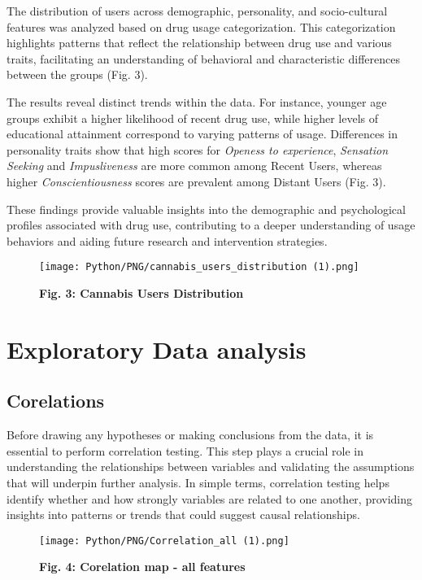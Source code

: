 \documentclass{article}
\begin{document}
\hspace{1cm}The distribution of users across demographic, personality, and socio-cultural features was analyzed based on drug usage categorization. This categorization highlights patterns that reflect the relationship between drug use and various traits, facilitating an understanding of behavioral and characteristic differences between the groups (Fig. 3).

The results reveal distinct trends within the data. For instance, younger age groups exhibit a higher likelihood of recent drug use, while higher levels of educational attainment correspond to varying patterns of usage. Differences in personality traits show that high scores for \textit{Openess to experience}, \textit{Sensation Seeking} and \textit{Impusliveness} are more common among Recent Users, whereas higher \textit{Conscientiousness} scores are prevalent among Distant Users (Fig. 3).

These findings provide valuable insights into the demographic and psychological profiles associated with drug use, contributing to a deeper understanding of usage behaviors and aiding future research and intervention strategies.
\newpage
\begin{figure}[!h]
    \centering
    \texttt{[image: Python/PNG/cannabis\_users\_distribution (1).png]}
    \caption{\textbf{Fig. 3: Cannabis Users Distribution}}
\end{figure}


\newpage
\section{Exploratory Data analysis}

\subsection{Corelations}

\hspace{1cm}Before drawing any hypotheses or making conclusions from the data, it is essential to perform correlation testing. This step plays a crucial role in understanding the relationships between variables and validating the assumptions that will underpin further analysis. In simple terms, correlation testing helps identify whether and how strongly variables are related to one another, providing insights into patterns or trends that could suggest causal relationships.

\vspace{1cm}
\begin{figure}[!h]
    \centering
    \texttt{[image: Python/PNG/Correlation\_all (1).png]}
    \caption{\textbf{Fig. 4: Corelation map - all features}}
\end{figure}
\end{document}
